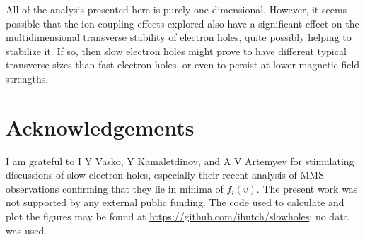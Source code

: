 \documentclass[12pt]{article}
\begin{document}
All of the analysis presented here is purely one-dimensional. However,
it seems possible that the ion coupling effects explored also have a
significant effect on the multidimensional transverse stability of
electron holes, quite possibly helping to stabilize it. If so, then
slow electron holes might prove to have different typical transverse
sizes than fast electron holes, or even to persist at lower magnetic
field strengths. 

\section*{Acknowledgements}

I am grateful to I Y Vasko, Y Kamaletdinov, and A V Artemyev for
stimulating discussions of slow electron holes, especially their
recent analysis of MMS observations confirming that they lie in minima
of $f_i(v)$. The present work was not supported by any external public
funding. The code used to calculate and plot the figures may be found
at \url{https://github.com/ihutch/slowholes}; no data was used.


\end{document}
